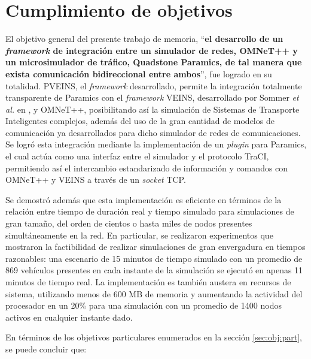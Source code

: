 \section{Cumplimiento de objetivos}\label{sec:conclusiones:obj}

El objetivo general del presente trabajo de memoria, ``\textbf{el desarrollo de un \textit{framework} de integración entre un simulador de redes, OMNeT++ y un microsimulador de tráfico, Quadstone Paramics, de tal manera que exista comunicación bidireccional entre ambos}'', fue logrado en su totalidad. PVEINS, el \emph{framework} desarrollado, permite la integración totalmente transparente de Paramics con el \emph{framework} VEINS, desarrollado por Sommer \emph{et al.} en \autocite{sommer_german_dressler}, y OMNeT++, posibilitando así la simulación de Sistemas de Transporte Inteligentes complejos, además del uso de la gran cantidad de modelos de comunicación ya desarrollados para dicho simulador de redes de comunicaciones. 
Se logró esta integración mediante la implementación de un \emph{plugin} para Paramics, el cual actúa como una interfaz entre el simulador y el protocolo TraCI, permitiendo así el intercambio estandarizado de información y comandos con OMNeT++ y VEINS a través de un \emph{socket} TCP. 

Se demostró además que esta implementación es eficiente en términos de la relación entre tiempo de duración real y tiempo simulado para simulaciones de gran tamaño, del orden de cientos o hasta miles de nodos presentes simultáneamente en la red. En particular, se realizaron experimentos que mostraron la factibilidad de realizar simulaciones de gran envergadura en tiempos razonables: una escenario de 15 minutos de tiempo simulado con un promedio de 869 vehículos presentes en cada instante de la simulación se ejecutó en apenas 11 minutos de tiempo real.
La implementación es también austera en recursos de sistema, utilizando menos de 600 MB de memoria y aumentando la actividad del procesador en un 20\% para una simulación con un promedio de 1400 nodos activos en cualquier instante dado.

En términos de los objetivos particulares enumerados en la sección \ref{sec:obj:part}, se puede concluir que:

